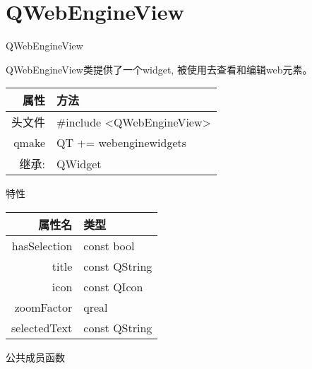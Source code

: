 \chapter{QWebEngineView}

QWebEngineView 

QWebEngineView类提供了一个widget, 被使用去查看和编辑web元素。


\begin{tabular}{|r|l|}
	\hline
	属性 & 方法 \\
	\hline
	头文件 & \#include <QWebEngineView>\\      
	\hline
	qmake & QT += webenginewidgets\\      
	\hline
	继承: & QWidget\\
	\hline
\end{tabular}

特性

\begin{tabular}{|r|l|}
	\hline
	属性名 & 类型 \\
	\hline
	hasSelection&	const bool \\
	\hline
	title	&const QString\\
	\hline
	icon	&const QIcon\\
	\hline
	zoomFactor&	qreal\\
	\hline
	selectedText&	const QString\\
	\hline
\end{tabular}

公共成员函数

